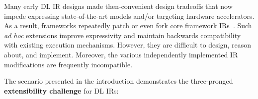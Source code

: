 Many early DL IR designs made then-convenient design tradeoffs that
  now impede expressing state-of-the-art models and/or
  targeting hardware accelerators.
As a result, frameworks repeatedly
  patch or even fork core framework IRs~\citep{
    tf_fold, tf_lite, tangent, tf_eager, xla, glow, torchscript}.
Such \textit{ad hoc} extensions improve expressivity and
  maintain backwards compatibility with existing execution mechanisms.
However, they are difficult to design, reason about, and implement.
Moreover, the various independently implemented IR modifications are frequently incompatible.

The scenario presented in the introduction demonstrates the three-pronged \textbf{extensibility challenge}
  for DL IRs:

